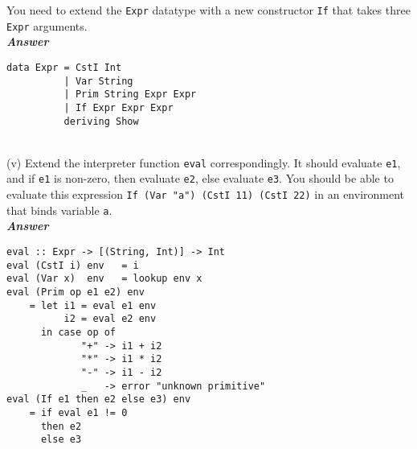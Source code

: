 \documentclass[a4paper]{article}
\begin{document}
\begin{exercise}
You need to extend the \texttt{Expr} datatype with a new constructor
\texttt{If} that takes three \texttt{Expr} arguments.\\
  
\noindent
\textbf{\emph{Answer}}
{\codesetup\begin{verbatim}
data Expr = CstI Int 
          | Var String
          | Prim String Expr Expr  
          | If Expr Expr Expr
          deriving Show
\end{verbatim}}\\

\noindent
(v) Extend the interpreter function \texttt{eval} correspondingly.  It
should evaluate \texttt{e1}, and if \texttt{e1} is non-zero, then
evaluate \texttt{e2}, else evaluate \texttt{e3}.  You should be able
to evaluate this expression \texttt{If (Var "a") (CstI 11) (CstI
  22)} in an environment that binds variable \texttt{a}.\\
      
\noindent
\textbf{\emph{Answer}}
{\codesetup\begin{verbatim}
eval :: Expr -> [(String, Int)] -> Int 
eval (CstI i) env   = i
eval (Var x)  env   = lookup env x
eval (Prim op e1 e2) env 
    = let i1 = eval e1 env
          i2 = eval e2 env
      in case op of
             "+" -> i1 + i2 
             "*" -> i1 * i2
             "-" -> i1 - i2
             _   -> error "unknown primitive"
eval (If e1 then e2 else e3) env
    = if eval e1 != 0
      then e2
      else e3
\end{verbatim}}\\

\end{exercise}
\end{document}
